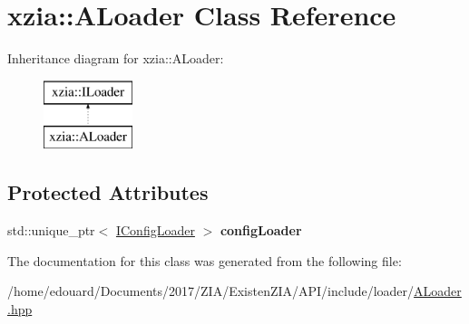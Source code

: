 \hypertarget{classxzia_1_1ALoader}{}\section{xzia\+:\+:A\+Loader Class Reference}
\label{classxzia_1_1ALoader}
Inheritance diagram for xzia\+:\+:A\+Loader\+:\begin{figure}[H]
\begin{center}
\leavevmode
\includegraphics[height=2.000000cm]{classxzia_1_1ALoader}
\end{center}
\end{figure}
\subsection*{Protected Attributes}
\begin{DoxyCompactItemize}
\item 
\mbox{\label{classxzia_1_1ALoader_afdc1357bc6a1be8d6f9e5fcb28588fe3}} 
std\+::unique\+\_\+ptr$<$ \mbox{\hyperlink{classxzia_1_1IConfigLoader}{I\+Config\+Loader}} $>$ {\bfseries config\+Loader}
\end{DoxyCompactItemize}


The documentation for this class was generated from the following file\+:\begin{DoxyCompactItemize}
\item 
/home/edouard/\+Documents/2017/\+Z\+I\+A/\+Existen\+Z\+I\+A/\+A\+P\+I/include/loader/\mbox{\hyperlink{ALoader_8hpp}{A\+Loader.\+hpp}}\end{DoxyCompactItemize}
